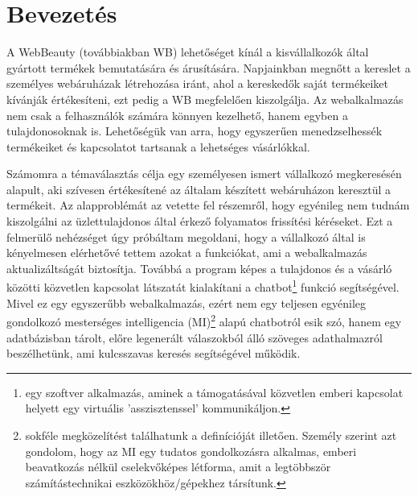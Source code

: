 \chapter{Bevezetés} %
\label{ch:intro}

A WebBeauty (továbbiakban WB) lehetőséget kínál a kisvállalkozók által gyártott termékek bemutatására és árusítására. Napjainkban megnőtt a kereslet a személyes webáruházak létrehozása iránt, ahol a kereskedők saját termékeiket kívánják értékesíteni, ezt pedig a WB megfelelően kiszolgálja. Az webalkalmazás nem csak a felhasználók számára könnyen kezelhető, hanem egyben a tulajdonosoknak is. Lehetőségük van arra, hogy egyszerűen menedzselhessék termékeiket és kapcsolatot tartsanak a lehetséges vásárlókkal.

Számomra a témaválasztás célja egy személyesen ismert vállalkozó megkeresésén alapult, aki szívesen értékesítené az általam készített webáruházon keresztül a termékeit. Az alapproblémát az vetette fel részemről, hogy egyénileg nem tudnám kiszolgálni az üzlettulajdonos által érkező folyamatos frissítési kéréseket. Ezt a felmerülő nehézséget úgy próbáltam megoldani, hogy a vállalkozó által is kényelmesen elérhetővé tettem azokat a funkciókat, ami a webalkalmazás aktualizáltságát biztosítja. Továbbá a program képes a tulajdonos és a vásárló közötti közvetlen kapcsolat látszatát kialakítani a chatbot\footnote{egy szoftver alkalmazás, aminek a támogatásával közvetlen emberi kapcsolat helyett egy virtuális ’asszisztenssel’ kommunikáljon.} funkció segítségével. Mivel ez egy egyszerűbb webalkalmazás, ezért nem egy teljesen egyénileg gondolkozó mesterséges intelligencia (MI)\footnote{sokféle megközelítést találhatunk a definícióját illetően. Személy szerint azt gondolom, hogy az MI egy tudatos gondolkozásra alkalmas, emberi beavatkozás nélkül cselekvőképes létforma, amit a legtöbbször számítástechnikai eszközökhöz/gépekhez társítunk.} alapú chatbotról esik szó, hanem egy adatbázisban tárolt, előre legenerált válaszokból álló szöveges adathalmazról beszélhetünk, ami kulcsszavas keresés segítségével működik.